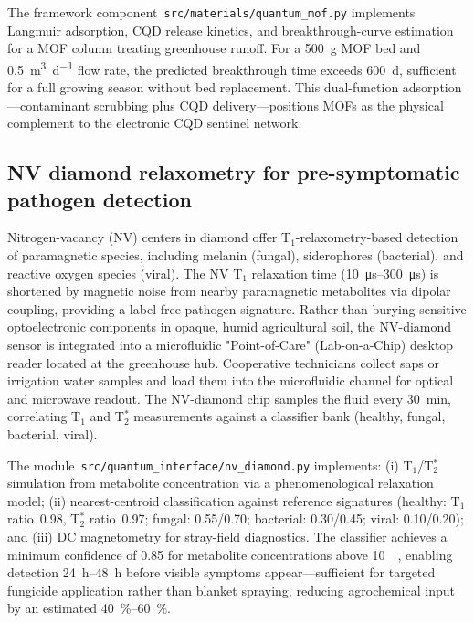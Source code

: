 \documentclass[11pt,a4paper]{article}
\begin{document}
The framework component~\texttt{src/materials/quantum\_mof.py} implements
Langmuir adsorption, CQD release kinetics, and breakthrough-curve estimation
for a MOF column treating greenhouse runoff. For a \qty{500}{\g} MOF bed and
\qty{0.5}{\m\cubed\per\day} flow rate, the predicted 
breakthrough time exceeds \qty{600}{\day}, sufficient for a full growing
season without bed replacement. This dual-function
adsorption---contaminant scrubbing plus CQD delivery---positions MOFs as the
physical complement to the electronic CQD sentinel network.

\subsection{NV diamond relaxometry for pre-symptomatic pathogen detection}
\label{SI-sec:nv_diamond}

Nitrogen-vacancy (NV) centers in diamond offer T$_1$-relaxometry-based
detection of paramagnetic species, including melanin (fungal), siderophores
(bacterial), and reactive oxygen species (viral). The NV T$_1$ relaxation time
(\qtyrange{10}{300}{\us}) is shortened by magnetic noise from nearby
paramagnetic metabolites via dipolar coupling, providing a label-free
pathogen signature. Rather than burying sensitive optoelectronic components in opaque, humid agricultural soil, the NV-diamond sensor is integrated into a microfluidic "Point-of-Care" (Lab-on-a-Chip) desktop reader located at the greenhouse hub. Cooperative technicians collect saps or irrigation water samples and load them into the microfluidic channel for optical and microwave readout. The NV-diamond chip
samples the fluid every \qty{30}{\minute}, correlating T$_1$ and T$_2^*$ measurements
against a classifier bank (healthy, fungal, bacterial, viral).

The module~\texttt{src/quantum\_interface/nv\_diamond.py} implements:
(i) T$_1$/T$_2^*$ simulation from metabolite concentration via a
phenomenological relaxation model; (ii) nearest-centroid classification
against reference signatures (healthy: T$_1$ ratio~0.98, T$_2^*$ ratio~0.97;
fungal: 0.55/0.70; bacterial: 0.30/0.45; viral: 0.10/0.20); and (iii) DC
magnetometry for stray-field diagnostics. The classifier achieves a
minimum confidence of 0.85 for metabolite concentrations above
\qty{10}{\micro\molar}, enabling detection \qtyrange{24}{48}{\hour} before visible symptoms
appear---sufficient for targeted fungicide application rather than blanket
spraying, reducing agrochemical input by an estimated \qtyrange{40}{60}{\percent}.
\end{document}
